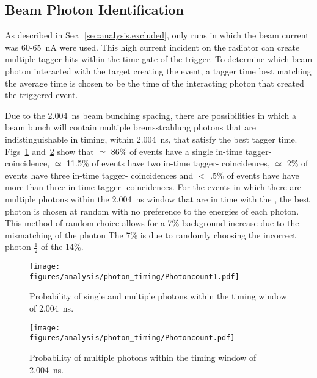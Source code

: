 \subsection{Beam Photon Identification}\label{sec:analysis.beam}

As described in Sec.~\ref{sec:analysis.excluded}, only runs in which the beam current was 60-65~nA were used. This high current incident on the radiator can create multiple tagger hits within the time gate of the trigger. To determine which beam photon interacted with the target creating the event, a tagger time best matching the average  time is chosen to be the time of the interacting photon that created the triggered event.

Due to the 2.004~ns  beam bunching spacing, there are possibilities in which a beam bunch will contain multiple bremsstrahlung photons that are indistinguishable in timing, within 2.004~ns, that satisfy the best tagger time. Figs~\ref{fig:beam.timing} and~\ref{fig:beam.timingII} show that $\simeq$ 86\% of events have a single in-time tagger- coincidence, $\simeq$ 11.5\% of events have two in-time tagger- coincidences, $\simeq$ 2\% of events have three in-time tagger- coincidences and $<$ .5\% of events have have more than three in-time tagger- coincidences. For the events in which there are multiple photons within the 2.004~ns window that are in time with the , the best photon is chosen at random with no preference to the energies of each photon. This method of random choice allows for a 7\% background increase due to the mismatching of the photon The 7\% is due to randomly choosing the incorrect photon $\frac{1}{2}$ of the 14\%. 

\begin{figure}[h!]\begin{center}
\texttt{[image: \\figures/analysis/photon\_timing/Photoncount1.pdf]}
\caption[Probability of single and multiple photons within the  timing window of 2.004~ns]{\label{fig:beam.timing}Probability of single and multiple photons within the  timing window of 2.004~ns.}
\end{center}\end{figure}

\begin{figure}[h!]\begin{center}
\texttt{[image: \\figures/analysis/photon\_timing/Photoncount.pdf]}
\caption[Probability of multiple photons within the  timing window of 2.004~ns]{\label{fig:beam.timingII}Probability of multiple photons within the  timing window of 2.004~ns.}
\end{center}\end{figure}

\FloatBarrier